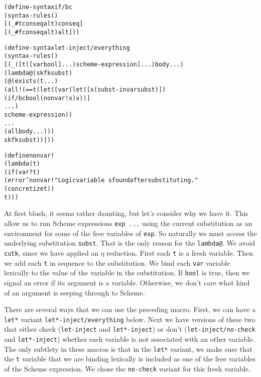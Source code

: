 \begin{alltt}
(define-syntax if/bc
  (syntax-rules ()
    [(_ #t conseq alt) conseq]
    [(_ #f conseq alt) alt]))

(define-syntax let-inject/everything
  (syntax-rules ()
    [(_ ([t ([var bool] ...) scheme-expression] ...) body ...)
     (lambda@ (sk fk subst)
       (@ (exists (t ...)
            (all! (== t (let ([var (let ([x (subst-in var subst)])
                                     (if/bc bool (nonvar! x) x))]
                              ...)
                          scheme-expression))
              ...
              (all body ...)))
          sk fk subst))]))

(define nonvar!
  (lambda (t)
    (if (var? t)
      (error 'nonvar! "Logic variable ~s found after substituting."
        (concretize t))
      t)))
\end{alltt}

At first blush, it seems rather daunting, but let's consider why we
have it.  This allow us to run Scheme expressions \texttt{exp ...}
using the current substitution as an environment for some of the free
variables of \texttt{exp}.  So naturally we must access the underlying
substitution \texttt{subst}.  That is the only reason for the
\texttt{lambda@}.  We avoid \texttt{cutk}, since we have applied an
$\eta$ reduction.  First each \texttt{t} is a fresh variable.  Then we
add each \texttt{t} in sequence to the substitution.  We bind each
\texttt{var} variable lexically to the value of the variable in the
substitution.  If \texttt{bool} is true, then we signal an error if
its argument is a variable.  Otherwise, we don't care what kind of an
argument is seeping through to Scheme.

There are several ways that we can use the preceding macro.  First, we
can have a \texttt{let*} variant \texttt{let*-inject/everything}
below.  Next we have versions of these two that either check
(\texttt{let-inject} and \texttt{let*-inject}) or don't
(\texttt{let-inject/no-check} and \texttt{let*-inject}) whether each
variable is not associated with an other variable.  The only subtlety
in these macros is that in the \texttt{let*} variant, we make sure
that the \texttt{t} variable that we are binding lexically is included
as one of the free variables of the Scheme expression.  We chose the
\texttt{no-check} variant for this fresh variable.

